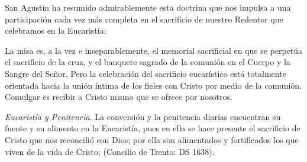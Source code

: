 \begin{ccebody}
 San Agustín ha resumido admirablemente esta doctrina que nos impulsa a una participación cada vez más completa en el sacrificio de nuestro Redentor que celebramos en la Eucaristía:



 La misa es, a la vez e inseparablemente, el memorial sacrificial en que se perpetúa el sacrificio de la cruz, y el banquete sagrado de la comunión en el Cuerpo y la Sangre del Señor. Pero la celebración del sacrificio eucarístico está totalmente orientada hacia la unión íntima de los fieles con Cristo por medio de la comunión. Comulgar es recibir a Cristo mismo que se ofrece por nosotros.

 \textit{Eucaristía y Penitencia}. La conversión y la penitencia diarias encuentran su fuente y su alimento en la Eucaristía, pues en ella se hace presente el sacrificio de Cristo que nos reconcilió con Dios; por ella son alimentados y fortificados los que viven de la vida de Cristo;  (Concilio de Trento: DS 1638).
\end{ccebody}


\newpage
{} 

